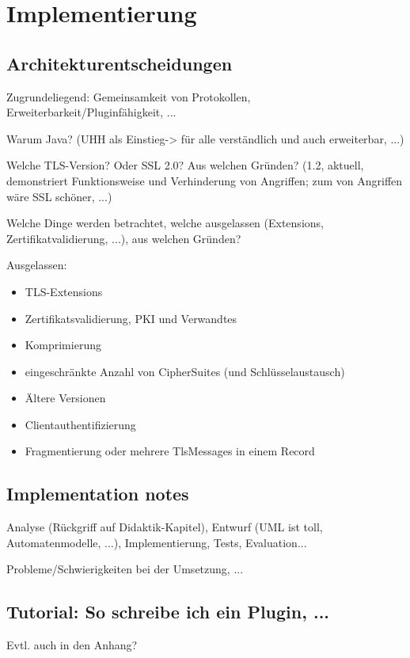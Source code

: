 \chapter{Implementierung}

\section{Architekturentscheidungen}

Zugrundeliegend: Gemeinsamkeit von Protokollen, Erweiterbarkeit/Pluginfähigkeit, ...

Warum Java? (UHH als Einstieg-> für alle verständlich und auch erweiterbar, ...)

Welche TLS-Version? Oder SSL 2.0? Aus welchen Gründen? (1.2, aktuell, demonstriert Funktionsweise und Verhinderung von Angriffen; zum  von Angriffen wäre SSL schöner, ...)

Welche Dinge werden betrachtet, welche ausgelassen (Extensions, Zertifikatvalidierung, ...), aus welchen Gründen?

Ausgelassen:
\begin{itemize}
\item TLS-Extensions
\item Zertifikatsvalidierung, PKI und Verwandtes
\item Komprimierung
\item eingeschränkte Anzahl von CipherSuites (und Schlüsselaustausch)
\item Ältere Versionen
\item Clientauthentifizierung
\item Fragmentierung oder mehrere TlsMessages in einem Record
\end{itemize}

\section{Implementation notes}

Analyse (Rückgriff auf Didaktik-Kapitel), Entwurf (UML ist toll, Automatenmodelle, ...), Implementierung, Tests, Evaluation...

Probleme/Schwierigkeiten bei der Umsetzung, ...

\section{Tutorial: So schreibe ich ein Plugin, ...}

Evtl. auch in den Anhang?